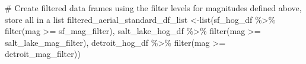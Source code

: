 \documentclass[
  letterpaper,
  DIV=11,
  numbers=noendperiod]{scrreprt}
\newenvironment{Shaded}{\begin{snugshade}}{\end{snugshade}}
\newcommand{\CommentTok}[1]{\textcolor[rgb]{0.37,0.37,0.37}{#1}}
\newcommand{\FunctionTok}[1]{\textcolor[rgb]{0.28,0.35,0.67}{#1}}
\newcommand{\NormalTok}[1]{\textcolor[rgb]{0.00,0.23,0.31}{#1}}
\newcommand{\OtherTok}[1]{\textcolor[rgb]{0.00,0.23,0.31}{#1}}
\newcommand{\SpecialCharTok}[1]{\textcolor[rgb]{0.37,0.37,0.37}{#1}}
\begin{document}
\begin{Shaded}
\begin{Highlighting}[]
\CommentTok{\# Create filtered data frames using the filter levels for magnitudes defined above, store all in a list}
\NormalTok{filtered\_aerial\_standard\_df\_list }\OtherTok{\textless{}{-}}\FunctionTok{list}\NormalTok{(sf\_hog\_df }\SpecialCharTok{\%\textgreater{}\%}
                                   \FunctionTok{filter}\NormalTok{(mag }\SpecialCharTok{\textgreater{}=}\NormalTok{ sf\_mag\_filter),}
\NormalTok{                                 salt\_lake\_hog\_df }\SpecialCharTok{\%\textgreater{}\%}
                                   \FunctionTok{filter}\NormalTok{(mag }\SpecialCharTok{\textgreater{}=}\NormalTok{ salt\_lake\_mag\_filter), }
\NormalTok{                                 detroit\_hog\_df }\SpecialCharTok{\%\textgreater{}\%}
                                   \FunctionTok{filter}\NormalTok{(mag }\SpecialCharTok{\textgreater{}=}\NormalTok{ detroit\_mag\_filter))}
\end{Highlighting}
\end{Shaded}
\end{document}
